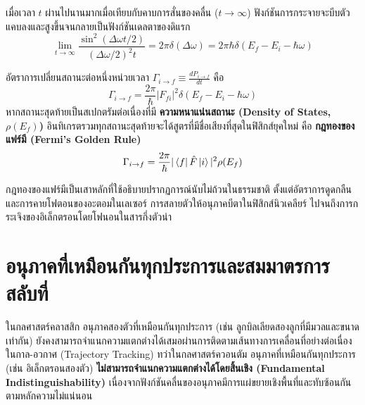 เมื่อเวลา $t$ ผ่านไปนานมากเมื่อเทียบกับคาบการสั่นของคลื่น ($t \to \infty$) ฟังก์ชันการกระจายจะบีบตัวแคบลงและสูงขึ้นจนกลายเป็นฟังก์ชันเดลตาของดิแรก
\begin{equation}
\lim_{t \to \infty} \frac{\sin^2(\Delta\omega t/2)}{(\Delta\omega/2)^2 t} = 2\pi \delta(\Delta\omega) = 2\pi\hbar \delta(E_f - E_i - \hbar\omega)
\end{equation}

อัตราการเปลี่ยนสถานะต่อหนึ่งหน่วยเวลา $\Gamma_{i \to f} \equiv \frac{dP_{i \to f}}{dt}$ คือ
\begin{equation}
\Gamma_{i \to f} = \frac{2\pi}{\hbar} |F_{fi}|^2 \delta(E_f - E_i - \hbar\omega)
\end{equation}
หากสถานะสุดท้ายเป็นสเปกตรัมต่อเนื่องที่มี \textbf{ความหนาแน่นสถานะ (Density of States, $\rho(E_f)$)} อินทิเกรตรวมทุกสถานะสุดท้ายจะได้สูตรที่มีชื่อเสียงที่สุดในฟิสิกส์ยุคใหม่ คือ \textbf{กฎทองของแฟร์มี (Fermi's Golden Rule)}
\begin{equation}
\Gamma_{i \to f} = \frac{2\pi}{\hbar} |\bra{f} \hat{F} \ket{i}|^2 \rho(E_f)
\label{eq:fermi_golden_rule}
\end{equation}

กฎทองของแฟร์มีเป็นเสาหลักที่ใช้อธิบายปรากฏการณ์นับไม่ถ้วนในธรรมชาติ ตั้งแต่อัตราการดูดกลืนและการคายโฟตอนของอะตอมในเลเซอร์ การสลายตัวให้อนุภาคบีตาในฟิสิกส์นิวเคลียร์ ไปจนถึงการกระเจิงของอิเล็กตรอนโดยโฟนอนในสารกึ่งตัวนำ

\section{อนุภาคที่เหมือนกันทุกประการและสมมาตรการสลับที่}

ในกลศาสตร์คลาสสิก อนุภาคสองตัวที่เหมือนกันทุกประการ (เช่น ลูกบิลเลียดสองลูกที่มีมวลและขนาดเท่ากัน) ยังคงสามารถจำแนกความแตกต่างได้เสมอผ่านการติดตามเส้นทางการเคลื่อนที่อย่างต่อเนื่องในกาล-อวกาศ (Trajectory Tracking) ทว่าในกลศาสตร์ควอนตัม อนุภาคที่เหมือนกันทุกประการ (เช่น อิเล็กตรอนสองตัว) \textbf{ไม่สามารถจำแนกความแตกต่างได้โดยสิ้นเชิง (Fundamental Indistinguishability)} เนื่องจากฟังก์ชันคลื่นของอนุภาคมีการแผ่ขยายเชิงพื้นที่และทับซ้อนกันตามหลักความไม่แน่นอน

